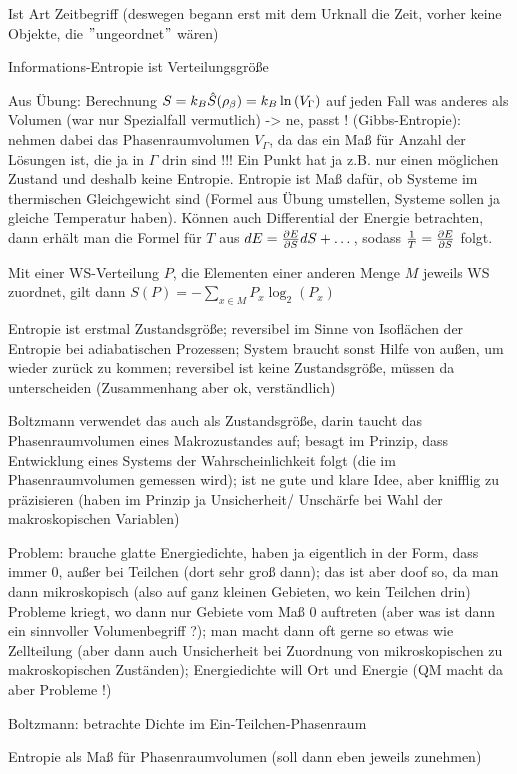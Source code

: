 \documentclass[../KlassMech_main.tex]{subfiles}
\begin{document}
Ist Art Zeitbegriff (deswegen begann erst mit dem Urknall die Zeit, vorher keine Objekte, die $"$ungeordnet$"$ wären)

Informations-Entropie ist Verteilungsgröße

Aus Übung: Berechnung $S =k_B \hat{S}(\rho_\beta) = k_B \ln\qty(V_\Gamma)$ auf jeden Fall was anderes als Volumen (war nur Spezialfall vermutlich) -> ne, passt ! (Gibbs-Entropie): nehmen dabei das Phasenraumvolumen $V_\Gamma$, da das ein Maß für Anzahl der Lösungen ist, die ja in $\Gamma$ drin sind !!! Ein Punkt hat ja z.B. nur einen möglichen Zustand und deshalb keine Entropie. Entropie ist Maß dafür, ob Systeme im thermischen Gleichgewicht sind (Formel aus Übung umstellen, Systeme sollen ja gleiche Temperatur haben). Können auch Differential der Energie betrachten, dann erhält man die Formel für $T$ aus $dE = \pdv{E}{S} dS + \dots$, sodass $\frac{1}{T} = \pdv{E}{S}$ folgt.

Mit einer WS-Verteilung $P$, die Elementen einer anderen Menge $M$ jeweils WS zuordnet, gilt dann $S(P) = - \sum\limits_{x \in M} P_x \log_2(P_x)$

Entropie ist erstmal Zustandsgröße; reversibel im Sinne von Isoflächen der Entropie bei adiabatischen Prozessen; System braucht sonst Hilfe von außen, um wieder zurück zu kommen; reversibel ist keine Zustandsgröße, müssen da unterscheiden (Zusammenhang aber ok, verständlich)

Boltzmann verwendet das auch als Zustandsgröße, darin taucht das Phasenraumvolumen eines Makrozustandes auf; besagt im Prinzip, dass Entwicklung eines Systems der Wahrscheinlichkeit folgt (die im Phasenraumvolumen gemessen wird); ist ne gute und klare Idee, aber knifflig zu präzisieren (haben im Prinzip ja Unsicherheit/ Unschärfe bei Wahl der makroskopischen Variablen)

Problem: brauche glatte Energiedichte, haben ja eigentlich in der Form, dass immer 0, außer bei Teilchen (dort sehr groß dann); das ist aber doof so, da man dann mikroskopisch (also auf ganz kleinen Gebieten, wo kein Teilchen drin) Probleme kriegt, wo dann nur Gebiete vom Maß 0 auftreten (aber was ist dann ein sinnvoller Volumenbegriff ?); man macht dann oft gerne so etwas wie Zellteilung (aber dann auch Unsicherheit bei Zuordnung von mikroskopischen zu makroskopischen Zuständen); Energiedichte will Ort und Energie (QM macht da aber Probleme !)

Boltzmann: betrachte Dichte im Ein-Teilchen-Phasenraum

Entropie als Maß für Phasenraumvolumen (soll dann eben jeweils zunehmen)
\end{document}
